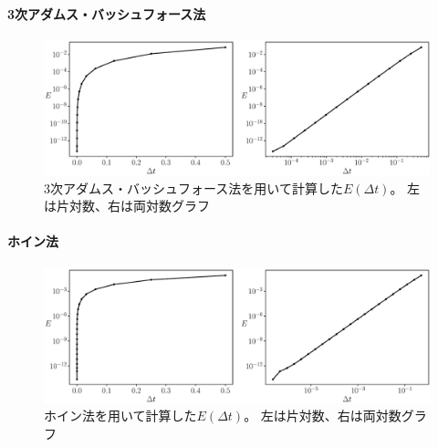 \documentclass[a4j, titlepage]{jsarticle}
\numberwithin{equation}{section}
\begin{document}
            \paragraph{3次アダムス・バッシュフォース法}
                \begin{center}
                    \begin{figure}[h]
                        \centering
                        \includegraphics[width=1\hsize]{kadai3/ab3.eps}
                        \caption{
                            3次アダムス・バッシュフォース法を用いて計算した$E(\Delta t)$。
                            左は片対数、右は両対数グラフ
                        }
                    \end{figure}
                \end{center}

            \paragraph{ホイン法}
                \begin{center}
                    \begin{figure}[h]
                        \centering
                        \includegraphics[width=1\hsize]{kadai3/heun.eps}
                        \caption{
                            ホイン法を用いて計算した$E(\Delta t)$。
                            左は片対数、右は両対数グラフ
                        }
                    \end{figure}
                \end{center}
\end{document}
